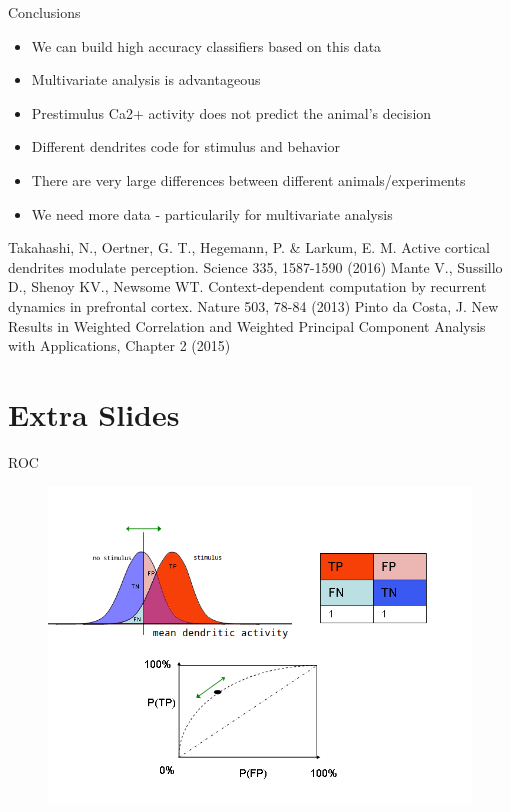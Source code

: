 \documentclass[10pt]{beamer}
\begin{document}
\begin{frame}[fragile]{Conclusions}
\begin{itemize}
\item We can build high accuracy classifiers based on this data
\item Multivariate analysis is advantageous
\item Prestimulus Ca2+ activity does not predict the animal's decision
\item Different dendrites code for stimulus and behavior
\item There are very large differences between different animals/experiments
\item We need more data - particularily for multivariate analysis
\end{itemize}
\end{frame}

\begin{frame}
\begin{thebibliography}{9}
 Takahashi, N., Oertner, G. T., Hegemann, P. \& Larkum, E. M. Active cortical dendrites modulate perception. Science 335, 1587-1590 (2016)
 Mante V., Sussillo D., Shenoy KV., Newsome WT. Context-dependent computation by recurrent dynamics in prefrontal cortex. Nature 503, 78-84 (2013)
 Pinto da Costa, J. New Results in Weighted Correlation and Weighted Principal Component Analysis with Applications, Chapter 2 (2015)
\end{thebibliography}
\end{frame}

\section*{Extra Slides}

\begin{frame}[fragile]{ROC}
\begin{center}
	\begin{figure}
      \includegraphics[width=1.0\textwidth]{roc_exp.png}
	\end{figure}
	\end{center}
\end{frame}
\end{document}
